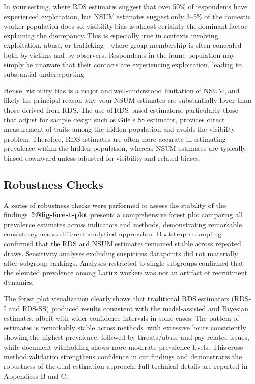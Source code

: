 \documentclass[
  12pt,
  letterpaper,
  DIV=11,
  numbers=noendperiod]{scrartcl}
\theoremstyle{plain}
\theoremstyle{definition}
\begin{document}
In your setting, where RDS estimates suggest that over 50\% of
respondents have experienced exploitation, but NSUM estimates suggest
only 3--5\% of the domestic worker population does so, visibility bias
is almost certainly the dominant factor explaining the discrepancy. This
is especially true in contexts involving exploitation, abuse, or
trafficking---where group membership is often concealed both by victims
and by observers. Respondents in the frame population may simply be
unaware that their contacts are experiencing exploitation, leading to
substantial underreporting.

Hense, visibility bias is a major and well-understood limitation of
NSUM, and likely the principal reason why your NSUM estimates are
substantially lower than those derived from RDS. The use of RDS-based
estimators, particularly those that adjust for sample design such as
Gile's SS estimator, provides direct measurement of traits among the
hidden population and avoids the visibility problem. Therefore, RDS
estimates are often more accurate in estimating prevalence within the
hidden population, whereas NSUM estimates are typically biased downward
unless adjusted for visibility and related biases.

\subsection{Robustness Checks}\label{robustness-checks}

A series of robustness checks were performed to assess the stability of
the findings. \textbf{?@fig-forest-plot} presents a comprehensive forest
plot comparing all prevalence estimates across indicators and methods,
demonstrating remarkable consistency across different analytical
approaches. Bootstrap resampling confirmed that the RDS and NSUM
estimates remained stable across repeated draws. Sensitivity analyses
excluding suspicious datapoints did not materially alter subgroup
rankings. Analyses restricted to single subgroups confirmed that the
elevated prevalence among Latinx workers was not an artifact of
recruitment dynamics.

The forest plot visualization clearly shows that traditional RDS
estimators (RDS-I and RDS-SS) produced results consistent with the
model-assisted and Bayesian estimates, albeit with wider confidence
intervals in some cases. The pattern of estimates is remarkably stable
across methods, with excessive hours consistently showing the highest
prevalence, followed by threats/abuse and pay-related issues, while
document withholding shows more moderate prevalence levels. This
cross-method validation strengthens confidence in our findings and
demonstrates the robustness of the dual estimation approach. Full
technical details are reported in Appendices B and C.
\end{document}
